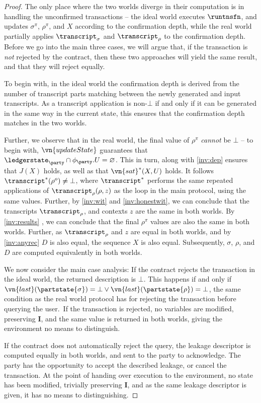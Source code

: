 \begin{proof}
The only place where the two worlds diverge in their computation is in handling
the unconfirmed transactions -- the ideal world executes $\runtnsfn$, and
updates $\sigma^\pi$, $\rho^\pi$, and $X$ according to the confirmation
  depth, while the real world partially applies $\transcript_\sigma$ and
  $\transcript_\rho$ to the confirmation depth. Before we go into the
main three cases, we will argue that, if the transaction is \emph{not} rejected
by the contract, then these two approaches will yield the same result, and that
they will reject equally.

To begin with, in the ideal world the confirmation depth is derived from the
number of transcript parts matching between the newly generated and input
transcripts. As a transcript application is non-$\bot$ if and only if it can be
generated in the same way in the current state, this ensures that the
confirmation depth matches in the two worlds.

Further, we observe that in the real world, the final value of $\rho^\pi$
\emph{cannot} be $\bot$ -- to begin with, $\vn{updateState}$ guarantees that
$\ledgerstate_\party \cap \phi_\party.U = \varnothing$. This in turn, along with
\ref{inv:dep} ensures that $J(X)$ holds, as well as that $\vn{sat}^{*}(X, U)$ holds.
It follows $\transcript^*(\rho^o) \neq \bot$, where $\transcript^*$ performs the
same repeated applications of $\transcript_\rho(\rho, z)$ as the loop in the
main protocol, using the same values. Further, by \ref{inv:wit} and
\ref{inv:honestwit}, we can conclude that the transcripts $\transcript_\rho$,
and contexts $z$ are the same in both worlds. By \ref{inv:results} , we can
conclude that the final $\rho^\pi$ values are also the same in both worlds.
Further, as $\transcript_\rho$ and $z$ are equal in both worlds, and by
\ref{inv:anyrec} $D$ is also equal, the sequence $X$ is also equal.
Subsequently, $\sigma$, $\rho$, and $D$ are computed equivalently in both
worlds.

We now consider the main case analysis: If the contract rejects the transaction
in the ideal world, the returned description is $\bot$. This happens if and only
if $\vn{last}(\partstate{\sigma}) = \bot \lor \vn{last}(\partstate{\rho}) = \bot$, the same condition as the real world
protocol has for rejecting the transaction before querying the user.\ If the
transaction is rejected, no variables are modified, preserving $\boldsymbol I$,
and the same value is returned in both worlds, giving the environment no means
to distinguish.

If the contract does not automatically reject the query, the leakage descriptor
is computed equally in both worlds, and sent to the party to acknowledge. The
party has the opportunity to accept the described leakage, or cancel the
transaction. At the point of handing over execution to the environment, no state
has been modified, trivially preserving $\boldsymbol I$, and as the same leakage
descriptor is given, it has no means to distinguishing.


\end{proof}
